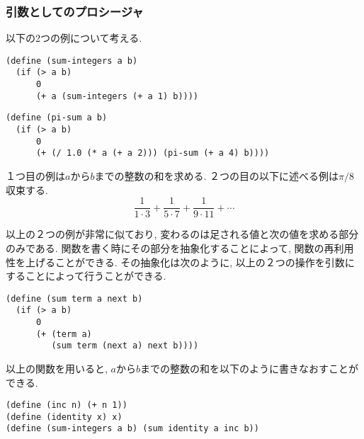 \subsubsection{引数としてのプロシージャ}
以下の2つの例について考える.
%
\begin{lstlisting}[basicstyle=\footnotesize,title=$a$から$b$までの整数の和]
(define (sum-integers a b)
  (if (> a b)
      0
      (+ a (sum-integers (+ a 1) b))))
\end{lstlisting}
%
\begin{lstlisting}[basicstyle=\footnotesize,title=$\pi/8$に収束する数列]
(define (pi-sum a b)
  (if (> a b)
      0
      (+ (/ 1.0 (* a (+ a 2))) (pi-sum (+ a 4) b))))
\end{lstlisting}

１つ目の例は$a$から$b$までの整数の和を求める. ２つの目の以下に述べる例は$\pi/8$収束する.
\vskip -5mm
\[
  \frac{1}{1\cdot 3} + \frac{1}{5\cdot 7} + \frac{1}{9\cdot 11} + \cdots
\]

以上の２つの例が非常に似ており, 変わるのは足される値と次の値を求める部分のみである.
関数を書く時にその部分を抽象化することによって, 関数の再利用性を上げることができる.
その抽象化は次のように, 以上の２つの操作を引数にすることによって行うことができる.
\begin{lstlisting}[basicstyle=\footnotesize,title=一般的な和の関数]
(define (sum term a next b)
  (if (> a b)
      0
      (+ (term a)
         (sum term (next a) next b))))
\end{lstlisting}

以上の関数を用いると, $a$から$b$までの整数の和を以下のように書きなおすことができる.
%
\begin{lstlisting}[basicstyle=\footnotesize,title=一般的な和を用いた$a$から$b$までの整数]
(define (inc n) (+ n 1))
(define (identity x) x)
(define (sum-integers a b) (sum identity a inc b))
\end{lstlisting}
